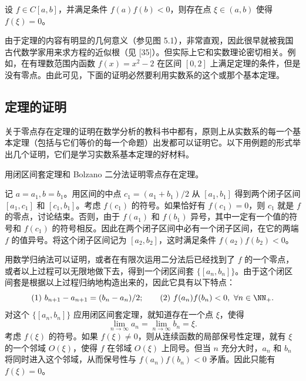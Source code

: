 \begin{xproposition}[5.2.1（零点存在定理）]
设 $f\in C[a,b]$，并满足条件 $f(a)f(b)<0$，则存在点 $\xi\in(a,b)$ 使得 $f(\xi)=0$。
\end{xproposition}

\begin{xremark}
由于定理的内容有明显的几何意义（参见图 5.1），非常直观，因此很早就被我国古代数学家用来求方程的近似根（见 [35]）。但实际上它和实数理论密切相关。例如，在有理数范围内函数 $f(x)=x^2-2$ 在区间 $[0,2]$ 上满足定理的条件，但是没有零点。由此可见，下面的证明必然要利用实数系的这个或那个基本定理。
\end{xremark}

\subsection{定理的证明}

关于零点存在定理的证明在数学分析的教科书中都有，原则上从实数系的每一个基本定理（包括与它们等价的每一个命题）出发都可以证明它。以下用例题的形式举出几个证明，它们是学习实数系基本定理的好材料。

\begin{xexample}[5.2.1]
用闭区间套定理和 Bolzano 二分法证明零点存在定理。
\end{xexample}
\begin{xproof}
记 $a=a_1,b=b_1$。用区间的中点 $c_1=(a_1+b_1)/2$ 从 $[a_1,b_1]$ 得到两个闭子区间 $[a_1,c_1]$ 和 $[c_1,b_1]$。考虑 $f(c_1)$ 的符号。如果恰好有 $f(c_1)=0$，则 $c_1$ 就是 $f$ 的零点，讨论结束。否则，由于 $f(a_1)$ 和 $f(b_1)$ 异号，其中一定有一个值的符号和 $f(c_1)$ 的符号相反。因此在两个闭子区间中必有一个闭子区间，在它的两端 $f$ 的值异号。将这个闭子区间记为 $[a_2,b_2]$，这时满足条件 $f(a_2)f(b_2)<0$。

用数学归纳法可以证明，或者在有限次运用二分法后已经找到了 $f$ 的一个零点，或者以上过程可以无限地做下去，得到一个闭区间套 $\{[a_n,b_n]\}$。由于这个闭区间套是根据以上过程归纳地构造出来的，因此它具有以下特点：
\[
  \text{(1) }b_{n+1}-a_{n+1}=(b_n-a_n)/2;\qquad
  \text{(2) }f(a_n)f(b_n)<0,\ \forall n\in\NN_+.
\]
对这个 $\{[a_n,b_n]\}$ 应用闭区间套定理，就知道存在一个点 $\xi$，使得
\[
  \lim_{n\to\infty}a_n=\lim_{n\to\infty}b_n=\xi.
\]
考虑 $f(\xi)$ 的符号。如果 $f(\xi)\ne0$，则从连续函数的局部保号性定理，就有 $\xi$ 的一个邻域 $O(\xi)$，使得 $f$ 在邻域 $O(\xi)$ 上同号。但当 $n$ 充分大时，$a_n$ 和 $b_n$ 将同时进入这个邻域，从而保号性与 $f(a_n)f(b_n)<0$ 矛盾。因此只能有 $f(\xi)=0$。
\end{xproof}

